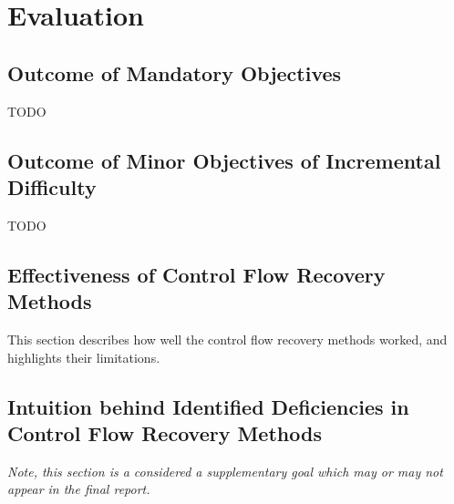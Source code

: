 \documentclass[12pt, a4paper]{article}
\begin{document}
\clearpage


\section{Evaluation}


\subsection{Outcome of Mandatory Objectives}

TODO


\subsection{Outcome of Minor Objectives of Incremental Difficulty}

TODO



\subsection{Effectiveness of Control Flow Recovery Methods}

This section describes how well the control flow recovery methods worked, and highlights their limitations.


\subsection{Intuition behind Identified Deficiencies in Control Flow Recovery Methods}

\textit{Note, this section is a considered a supplementary goal which may or may not appear in the final report.}
\end{document}
